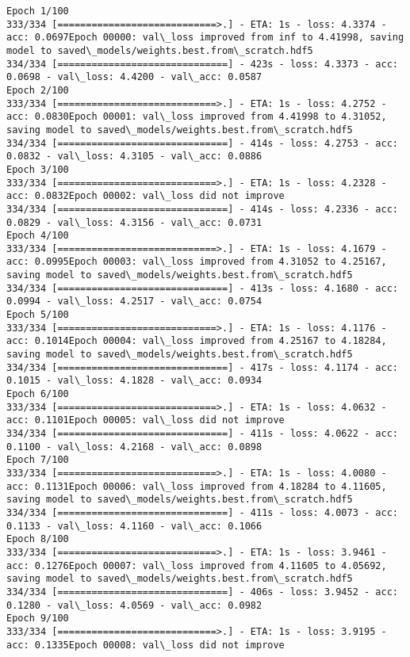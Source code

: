 \documentclass[11pt]{article}
\begin{document}
    \begin{Verbatim}[commandchars=\\\{\}]
Epoch 1/100
333/334 [============================>.] - ETA: 1s - loss: 4.3374 - acc: 0.0697Epoch 00000: val\_loss improved from inf to 4.41998, saving model to saved\_models/weights.best.from\_scratch.hdf5
334/334 [==============================] - 423s - loss: 4.3373 - acc: 0.0698 - val\_loss: 4.4200 - val\_acc: 0.0587
Epoch 2/100
333/334 [============================>.] - ETA: 1s - loss: 4.2752 - acc: 0.0830Epoch 00001: val\_loss improved from 4.41998 to 4.31052, saving model to saved\_models/weights.best.from\_scratch.hdf5
334/334 [==============================] - 414s - loss: 4.2753 - acc: 0.0832 - val\_loss: 4.3105 - val\_acc: 0.0886
Epoch 3/100
333/334 [============================>.] - ETA: 1s - loss: 4.2328 - acc: 0.0832Epoch 00002: val\_loss did not improve
334/334 [==============================] - 414s - loss: 4.2336 - acc: 0.0829 - val\_loss: 4.3156 - val\_acc: 0.0731
Epoch 4/100
333/334 [============================>.] - ETA: 1s - loss: 4.1679 - acc: 0.0995Epoch 00003: val\_loss improved from 4.31052 to 4.25167, saving model to saved\_models/weights.best.from\_scratch.hdf5
334/334 [==============================] - 413s - loss: 4.1680 - acc: 0.0994 - val\_loss: 4.2517 - val\_acc: 0.0754
Epoch 5/100
333/334 [============================>.] - ETA: 1s - loss: 4.1176 - acc: 0.1014Epoch 00004: val\_loss improved from 4.25167 to 4.18284, saving model to saved\_models/weights.best.from\_scratch.hdf5
334/334 [==============================] - 417s - loss: 4.1174 - acc: 0.1015 - val\_loss: 4.1828 - val\_acc: 0.0934
Epoch 6/100
333/334 [============================>.] - ETA: 1s - loss: 4.0632 - acc: 0.1101Epoch 00005: val\_loss did not improve
334/334 [==============================] - 411s - loss: 4.0622 - acc: 0.1100 - val\_loss: 4.2168 - val\_acc: 0.0898
Epoch 7/100
333/334 [============================>.] - ETA: 1s - loss: 4.0080 - acc: 0.1131Epoch 00006: val\_loss improved from 4.18284 to 4.11605, saving model to saved\_models/weights.best.from\_scratch.hdf5
334/334 [==============================] - 411s - loss: 4.0073 - acc: 0.1133 - val\_loss: 4.1160 - val\_acc: 0.1066
Epoch 8/100
333/334 [============================>.] - ETA: 1s - loss: 3.9461 - acc: 0.1276Epoch 00007: val\_loss improved from 4.11605 to 4.05692, saving model to saved\_models/weights.best.from\_scratch.hdf5
334/334 [==============================] - 406s - loss: 3.9452 - acc: 0.1280 - val\_loss: 4.0569 - val\_acc: 0.0982
Epoch 9/100
333/334 [============================>.] - ETA: 1s - loss: 3.9195 - acc: 0.1335Epoch 00008: val\_loss did not improve

\end{Verbatim}
\end{document}
